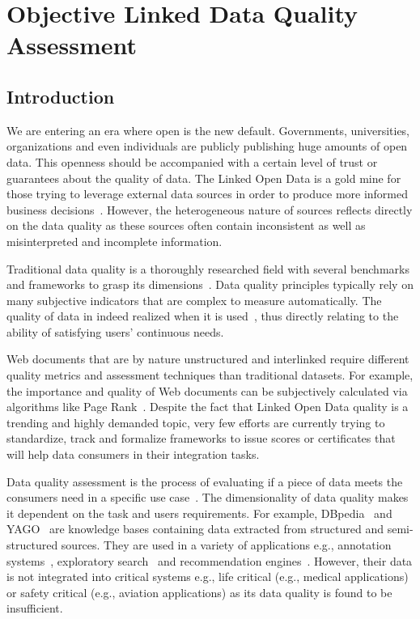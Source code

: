 \chapter{Objective Linked Data Quality Assessment}\label{chapter:data-quality}
\graphicspath{{Part1/Chapter3/figures/}}

\section{Introduction}

We are entering an era where open is the new default. Governments, universities, organizations and even individuals are publicly publishing huge amounts of open data. This openness should be accompanied with a certain level of trust or guarantees about the quality of data. The Linked Open Data is a gold mine for those trying to leverage external data sources in order to produce more informed business decisions~\cite{Boyd:Article:11}. However, the heterogeneous nature of sources reflects directly on the data quality as these sources often contain inconsistent as well as misinterpreted and incomplete information.

Traditional data quality is a thoroughly researched field with several benchmarks and frameworks to grasp its dimensions~\cite{Kahn:ACM:02,Stvilia:ASIST:07,Wang:MIS:96}. Data quality principles typically rely on many subjective indicators that are complex to measure automatically. The quality of data in indeed realized when it is used~\cite{Juran:McGraw:99}, thus directly relating to the ability of satisfying users' continuous needs.

Web documents that are by nature unstructured and interlinked require different quality metrics and assessment techniques than traditional datasets. For example, the importance and quality of Web documents can be subjectively calculated via algorithms like Page Rank~\cite{ Page:TechReport:98}. Despite the fact that Linked Open Data quality is a trending and highly demanded topic, very few efforts are currently trying to standardize, track and formalize frameworks to issue scores or certificates that will help data consumers in their integration tasks.

Data quality assessment is the process of evaluating if a piece of data meets the consumers need in a specific use case~\cite{Bizer:WebSemantics:09}. The dimensionality of data quality makes it dependent on the task and users requirements. For example, DBpedia~\cite{Bizer:WebSemJorunal:09} and YAGO~\cite{Suchanek::WWW:07} are knowledge bases containing data extracted from structured and semi-structured sources. They are used in a variety of applications  e.g., annotation systems~\cite{Mendes:ICS:11}, exploratory search~\cite{Marie:ICS:13} and recommendation engines~\cite{DiNoia:iSemantics:12}. However, their data is not integrated into critical systems e.g., life critical (e.g., medical applications) or safety critical (e.g., aviation applications) as its data quality is found to be insufficient.

